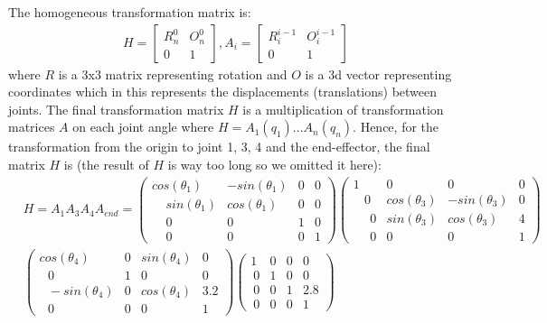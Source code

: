 \documentclass[11pt]{article}
\begin{document}
The homogeneous transformation matrix is:
\begin{equation}
\begin{split}
    H=\begin{bmatrix} R_{n}^{0} & O_{n}^{0} \\ 0 & 1 \end{bmatrix}, A_{i}=\begin{bmatrix} R_{i}^{i-1} & O_{i}^{i-1} \\ 0 & 1 \end{bmatrix}
\end{split}
\end{equation}
where $R$ is a 3x3 matrix representing rotation and $O$ is a 3d vector representing coordinates which in this represents the displacements (translations) between joints. The final transformation matrix $H$ is a multiplication of transformation matrices $A$ on each joint angle where $H=A_{1}(q_{1})...A_{n}(q_{n})$. Hence, for the transformation from the origin to joint 1, 3, 4 and the end-effector, the final matrix $H$ is (the result of $H$ is way too long so we omitted it here):
\begin{equation}
\begin{split}
    & H=A_{1}A_{3}A_{4}A_{end}
    =\begin{pmatrix}cos\left(\theta _{1}\right)&-sin\left(\theta _{1}\right)&0&0\\ \:\:\:\:\:sin\left(\theta _{1}\right)&cos\left(\theta _{1}\right)&0&0\\ \:\:\:\:\:0&0&1&0\\ \:\:\:\:\:0&0&0&1\end{pmatrix}
    \begin{pmatrix}1&0&0&0\\ \:\:\:\:0&cos\left(\theta _{3}\right)&-sin\left(\theta _{3}\right)&0\\ \:\:\:\:\:\:0&sin\left(\theta _{3}\right)&cos\left(\theta _{3}\right)&4\\ \:\:\:\:\:\:0&0&0&1\end{pmatrix} \\ 
    & \begin{pmatrix}cos\left(\theta _{4}\right)&0&sin\left(\theta _{4}\right)&0\\ \:\:\:0&1&0&0\\ \:\:\:-sin\left(\theta _{4}\right)&0&cos\left(\theta _{4}\right)&3.2\\ \:\:\:0&0&0&1\end{pmatrix} \begin{pmatrix}1&0&0&0\\ \:0&1&0&0\\ \:0&0&1&2.8\\ \:0&0&0&1\end{pmatrix} \\
\end{split}
\end{equation}
\end{document}
